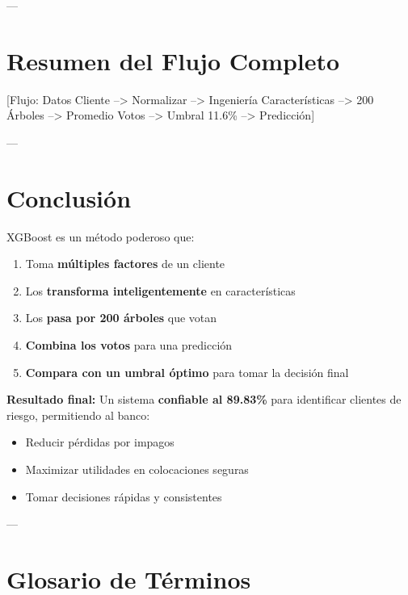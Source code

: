 \documentclass[11pt,a4paper,spanish]{article}
\begin{document}
---

\section{Resumen del Flujo Completo}

[Flujo: Datos Cliente --> Normalizar --> Ingeniería Características --> 200 Árboles --> Promedio Votos --> Umbral 11.6\% --> Predicción]

---

\section{Conclusión}

XGBoost es un método poderoso que:

\begin{enumerate}
    \item Toma \textbf{múltiples factores} de un cliente
    \item Los \textbf{transforma inteligentemente} en características
    \item Los \textbf{pasa por 200 árboles} que votan
    \item \textbf{Combina los votos} para una predicción
    \item \textbf{Compara con un umbral óptimo} para tomar la decisión final
\end{enumerate}

\textbf{Resultado final:} Un sistema \textbf{confiable al 89.83\%} para identificar clientes de riesgo, permitiendo al banco:
\begin{itemize}
    \item Reducir pérdidas por impagos
    \item Maximizar utilidades en colocaciones seguras
    \item Tomar decisiones rápidas y consistentes
\end{itemize}

---

\appendix

\section{Glosario de Términos}
\end{document}
